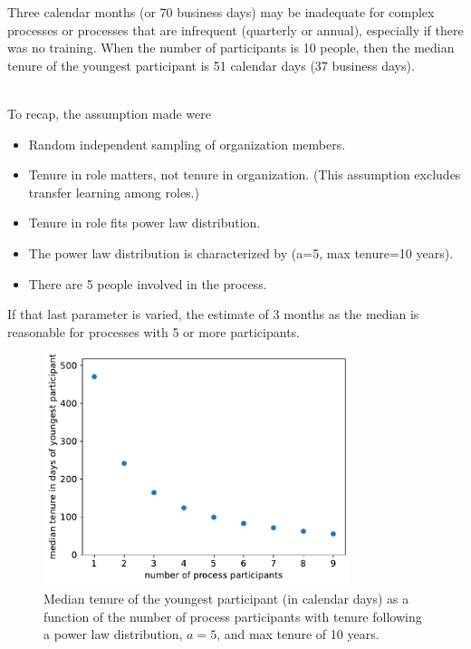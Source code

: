Three calendar months (or 70 business days) may be inadequate for complex processes or processes that are infrequent (quarterly or annual), especially if there was no training. When the number of participants is 10 people, then the median tenure of the youngest participant is 51 calendar days (37 business days).

\ \\

To recap, the assumption made were
\begin{itemize}
    \item Random independent sampling of organization members. 
    \item Tenure in role matters, not tenure in organization. (This assumption excludes transfer learning among roles.)
    \item Tenure in role fits power law distribution.
    \item The power law distribution is characterized by (a=5, max tenure=10 years). 
    \item There are 5 people involved in the process.
\end{itemize}
If that last parameter is varied, the estimate of 3 months as the median  is reasonable for processes with 5 or more participants.

\begin{figure}[H]
    \centering
    \includegraphics[width=0.8\textwidth]{images/tenure_power_distribution_a5_with_max_tenure10.pdf}
    \caption{Median tenure of the youngest participant (in calendar days) as a function of the number of process participants with tenure following a power law distribution, $a=5$, and max tenure of 10 years.}
    \label{fig:tenure-powerlaw-5-participants}
\end{figure}


